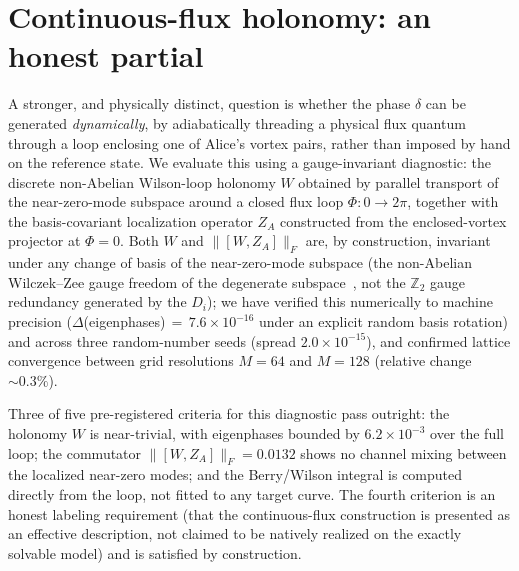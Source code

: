 \documentclass[aps,pra,twocolumn,superscriptaddress,floatfix,nofootinbib]{revtex4-2}
\begin{document}
\section{Continuous-flux holonomy: an honest partial}
\label{sec:m5flux}

A stronger, and physically distinct, question is whether the phase
$\delta$ can be generated \emph{dynamically}, by adiabatically
threading a physical flux quantum through a loop enclosing one of
Alice's vortex pairs, rather than imposed by hand on the reference
state. We evaluate this using a gauge-invariant diagnostic: the
discrete non-Abelian Wilson-loop holonomy $W$ obtained by parallel
transport of the near-zero-mode subspace around a closed flux loop
$\Phi:0\to2\pi$, together with the basis-covariant localization
operator $Z_A$ constructed from the enclosed-vortex projector at
$\Phi=0$. Both $W$ and $\lVert[W,Z_A]\rVert_F$ are, by construction,
invariant under any change of basis of the near-zero-mode subspace
(the non-Abelian Wilczek--Zee gauge freedom of the degenerate
subspace~\cite{WilczekZee1984}, not the $\mathbb{Z}_2$ gauge
redundancy generated by the $D_i$); we
have verified this numerically to machine precision
($\Delta$(eigenphases)$\,{=}\,7.6\times10^{-16}$ under an explicit
random basis rotation) and across three random-number seeds
(spread $2.0\times10^{-15}$), and confirmed lattice convergence between
grid resolutions $M=64$ and $M=128$ (relative change $\sim0.3\%$).

Three of five pre-registered criteria for this diagnostic pass
outright: the holonomy $W$ is near-trivial, with eigenphases bounded
by $6.2\times10^{-3}$ over the full loop; the commutator
$\lVert[W,Z_A]\rVert_F=0.0132$ shows no channel mixing between the
localized near-zero modes; and the Berry/Wilson integral is computed
directly from the loop, not fitted to any target curve. The fourth
criterion is an honest labeling requirement (that the continuous-flux
construction is presented as an effective description, not claimed to
be natively realized on the exactly solvable model) and is satisfied
by construction.
\end{document}

